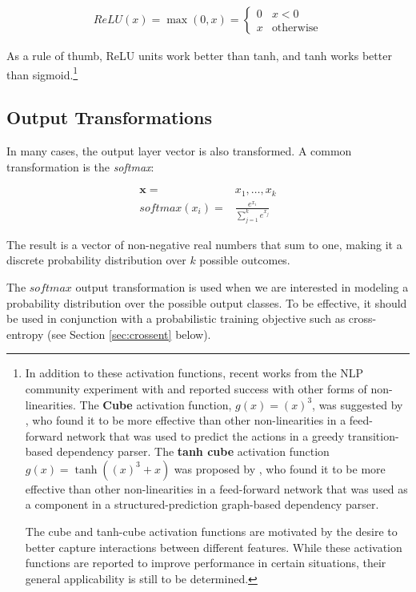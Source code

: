 \documentclass[jair,twoside,11pt,theapa]{article}
\newcommand{\m}[1]{\mathbf{#1}}%
\begin{document}
{\begin{align*}
    ReLU(x) = \max(0,x) = \begin{cases}
        0 & x < 0 \\
        x & \text{otherwise}
    \end{cases}
\end{align*}

As a rule of thumb, ReLU units work better than tanh, and tanh works better than
sigmoid.\footnote{
In addition to these activation functions, recent works from the NLP community
experiment with and reported success with other forms of non-linearities.
The \textbf{Cube} activation function, $g(x) = (x)^3$, was suggested by
\cite{chen2014fast}, who found it to be more effective than other non-linearities
in a feed-forward network that was used to predict the actions in a greedy
transition-based dependency parser.
The \textbf{tanh cube} activation function $g(x) = \tanh( (x)^3 +
x)$ was proposed by \cite{pei2015effective},
who found it to be more effective than other non-linearities
in a feed-forward network that was used as a component in a
structured-prediction graph-based dependency parser.

The cube and tanh-cube activation functions are motivated by the desire
to better capture interactions between different features.
While these activation functions are reported to improve performance in certain
situations, their general applicability is still to be determined.}

\subsection{Output Transformations}
\label{sec:softmax}

In many cases, the output layer vector is also transformed.
A common transformation is the \emph{softmax}:

\begin{align*}
           \m{x} =& x_1,\ldots,x_k \\
    softmax(x_i) =& \frac{e^{x_i}}{\sum_{j=1}^{k} e^{x_j}} 
\end{align*}

The result is a vector of non-negative real numbers that sum to one, making it a
discrete probability distribution over $k$ possible outcomes.

The $softmax$ output transformation is used when we are
interested in modeling a probability distribution over the possible output
classes.  To be effective, it should be used in conjunction with a probabilistic
training objective such as cross-entropy (see Section \ref{sec:crossent} below).

}
\end{document}
